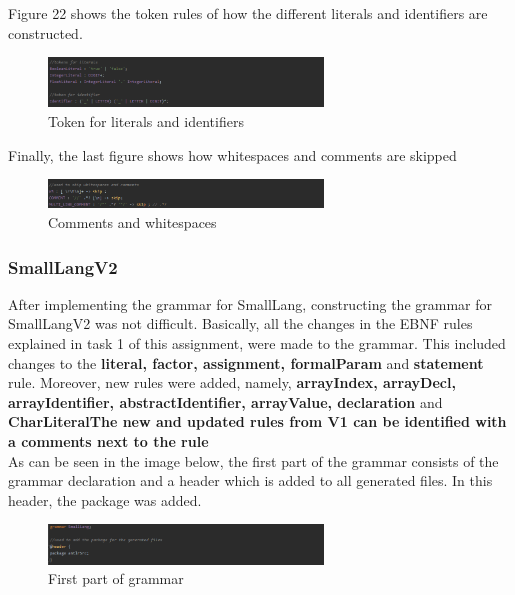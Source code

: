 \documentclass{article}
\begin{document}
					\noindent Figure 22 shows the token rules of how the different literals and identifiers are constructed.
				
			
						\begin{figure}[H]
					\centering
			 			\includegraphics[width=0.65\textwidth]{antlrv1_7.png}
			  			\caption{Token for literals and identifiers}
			  			\label{fig:antlrv1_7}
					\end{figure}
					
					\noindent Finally, the last figure shows how whitespaces and comments are skipped
				
			
						\begin{figure}[H]
					\centering
			 			\includegraphics[width=0.65\textwidth]{antlrv1_8.png}
			  			\caption{Comments and whitespaces}
			  			\label{fig:antlrv1_8}
					\end{figure}
			\pagebreak
					
			\subsubsection{SmallLangV2}
			
			After implementing the grammar for SmallLang, constructing the grammar for SmallLangV2 was not difficult. Basically, all the changes in the EBNF rules explained in task 1 of this assignment, were made to the grammar.  This included changes to the \textbf{literal, factor, assignment, formalParam} and \textbf{statement} rule. Moreover, new rules were added, namely, \textbf{arrayIndex, arrayDecl, arrayIdentifier, abstractIdentifier, arrayValue, declaration} and \textbf{CharLiteral}\textbf{The new and updated rules from V1 can be identified with a comments next to the rule}\\
			
								\noindent As can be seen in the image below, the first part of the grammar consists of the grammar declaration and a header which is added to all generated files. In this header, the package was added.
	
			
			
								\begin{figure}[H]
					\centering
			 			\includegraphics[width=0.65\textwidth]{antlrv1_1.png}
			  			\caption{First part of grammar}
			  			\label{fig:antlrv1_1}
					\end{figure}
					
\end{document}

